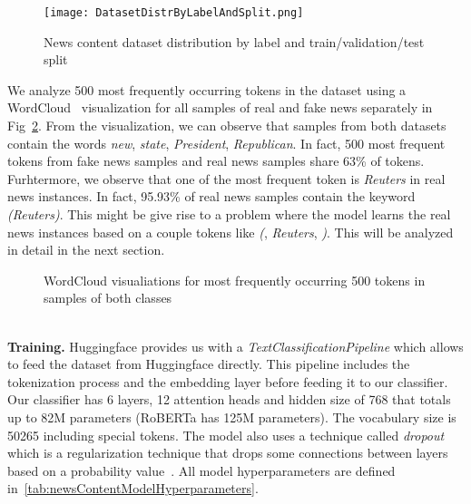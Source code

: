 \begin{figure}
    \centering
    \texttt{[image: DatasetDistrByLabelAndSplit.png]}
    \caption[News content dataset distribution by label and train/validation/test split]{News content dataset distribution by label and train/validation/test split}
    \label{fig:DatasetDistributionByLabelAndSplit}
\end{figure}
We analyze 500 most frequently occurring tokens in the dataset using a WordCloud~\parencite{WordCloud_Oesper} visualization for all samples of real and fake news separately in Fig~\ref{fig:WordCloudVisualizations}. From the visualization, we can observe that samples from both datasets contain the words \emph{new}, \emph{state}, \emph{President}, \emph{Republican}. In fact, 500 most frequent tokens from fake news samples and real news samples share 63\% of tokens. Furhtermore, we observe that one of the most frequent token is \emph{Reuters} in real news instances. In fact, 95.93\% of real news samples contain the keyword \emph{(Reuters)}. This might be give rise to a problem where the model learns the real news instances based on a couple tokens like \emph{(}, \emph{Reuters}, \emph{)}. This will be analyzed in detail in the next section.
\pagebreak
\begin{figure}
    \centering
    \hfill
    \caption[WordCloud visualiations for most frequently occurring 500 tokens in both classes]{WordCloud visualiations for most frequently occurring 500 tokens in samples of both classes}
    \label{fig:WordCloudVisualizations}
\end{figure}\\
\textbf{Training.} Huggingface provides us with a \emph{TextClassificationPipeline} which allows to feed the dataset from Huggingface directly\parencite{Transformers_Wolf}. This pipeline includes the tokenization process and the embedding layer before feeding it to our classifier. Our classifier has 6 layers, 12 attention heads and  hidden size of 768 that totals up to 82M parameters (RoBERTa has 125M parameters). The vocabulary size is 50265 including special tokens. The model also uses a technique called \emph{dropout} which is a regularization technique that drops some connections between layers based on a probability value~\parencite{Dropout_Nitish}. All model hyperparameters are defined in~\ref{tab:newsContentModelHyperparameters}.\\
